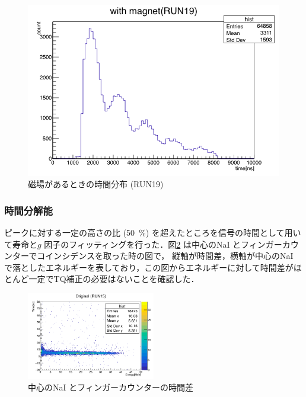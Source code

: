 \begin{figure}[H]
\begin{minipage}{0.45\hsize}
\centering
\includegraphics[width  = 1.0\textwidth]{figure/mino/with_mag_RUN19.png}
\caption{磁場があるときの時間分布 (RUN19)}
\label{fig:with_mag_RUN19}
\end{minipage}
\end{figure}


\subsubsection{時間分解能}
ピークに対する一定の高さの比 (50~\%) を超えたところを信号の時間として用いて寿命と$g$ 因子のフィッティングを行った．図\ref{fig:Original} は中心のNaI とフィンガーカウンターでコインシデンスを取った時の図で， 縦軸が時間差，横軸が中心のNaI で落としたエネルギーを表しており，この図からエネルギーに対して時間差がほとんど一定でTQ補正の必要はないことを確認した．

\begin{figure}[H]%
\centering
\includegraphics[width  = 0.5\textwidth]{figure/mino/Original.png}
\caption{中心のNaI とフィンガーカウンターの時間差}
\label{fig:Original}
\end{figure}

